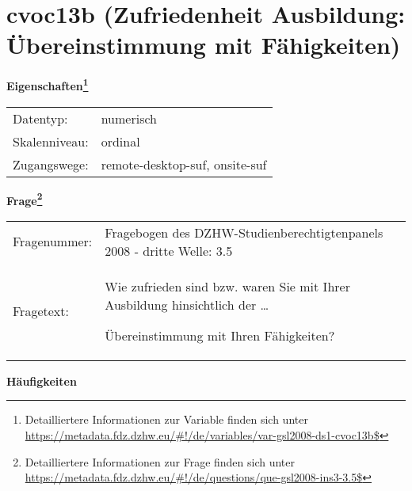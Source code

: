 
    \setcounter{footnote}{0}

    \vspace*{-1.8cm}
	\section{cvoc13b (Zufriedenheit Ausbildung: Übereinstimmung mit Fähigkeiten)}
	\label{section:cvoc13b}



    \vspace*{0.5cm}
    \noindent\textbf{Eigenschaften\footnote{Detailliertere Informationen zur Variable finden sich unter
		\url{https://metadata.fdz.dzhw.eu/\#!/de/variables/var-gsl2008-ds1-cvoc13b$}}}\\
	\begin{tabularx}{\hsize}{@{}lX}
	Datentyp: & numerisch \\
	Skalenniveau: & ordinal \\
	Zugangswege: &
	  remote-desktop-suf, 
	  onsite-suf
 \\
    \end{tabularx}



				\vspace*{0.5cm}
                \noindent\textbf{Frage\footnote{Detailliertere Informationen zur Frage finden sich unter
		              \url{https://metadata.fdz.dzhw.eu/\#!/de/questions/que-gsl2008-ins3-3.5$}}}\\
				\begin{tabularx}{\hsize}{@{}lX}
					Fragenummer: &
					  Fragebogen des DZHW-Studienberechtigtenpanels 2008 - dritte Welle:
					  3.5
 \\
					Fragetext: & Wie zufrieden sind bzw. waren Sie mit Ihrer Ausbildung hinsichtlich der …\par  Übereinstimmung mit Ihren Fähigkeiten? \\
				\end{tabularx}





        		\vspace*{0.5cm}
                \noindent\textbf{Häufigkeiten}

